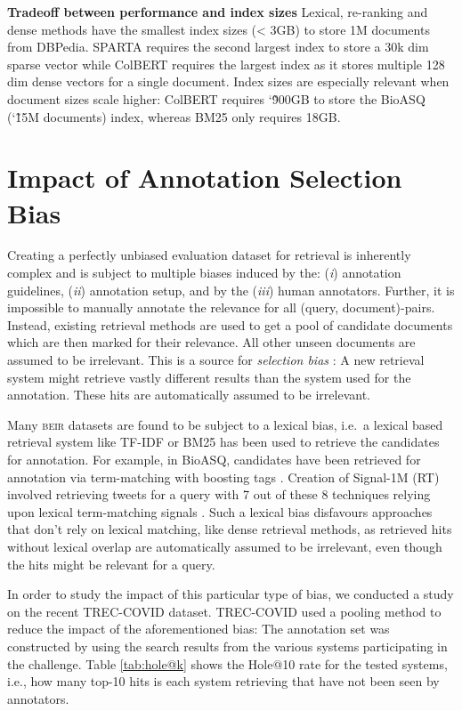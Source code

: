 \documentclass{article}
\newcommand{\custo}[1]{\textsc{\normalsize #1}}
\newcommand{\beir}{\custo{beir}\xspace}
\begin{document}
\textbf{Tradeoff between performance and index sizes} \quad Lexical, re-ranking and dense methods have the smallest index sizes (< 3GB) to store 1M documents from DBPedia. SPARTA requires the second largest index to store a 30k dim sparse vector while ColBERT requires the largest index as it stores multiple 128 dim dense vectors for a single document. Index sizes are especially relevant when document sizes scale higher: ColBERT requires \char`\~900GB to store the BioASQ (\char`\~15M documents) index, whereas BM25 only requires 18GB. 

\vspace{-3mm}
\section{Impact of Annotation Selection Bias}\label{sec:biases-analysis}
\vspace{-2mm}

Creating a perfectly unbiased evaluation dataset for retrieval is inherently complex and is subject to multiple biases induced by the: (\emph{i}) annotation guidelines, (\emph{ii}) annotation setup, and by the (\emph{iii}) human annotators. Further, it is impossible to manually annotate the relevance for all (query, document)-pairs. Instead, existing retrieval methods are used to get a pool of candidate documents which are then marked for their relevance. All other unseen documents are assumed to be irrelevant.
This is a source for \textit{selection bias} \cite{selection_bias}: A new retrieval system might retrieve vastly different results than the system used for the annotation. These hits are automatically assumed to be irrelevant.

Many \beir datasets are found to be subject to a lexical bias, i.e.\ a lexical based retrieval system like TF-IDF or BM25 has been used to retrieve the candidates for annotation. For example, in BioASQ, candidates have been retrieved for annotation via term-matching with boosting tags \cite{tsatsaronis2015overview}. Creation of Signal-1M (RT) involved retrieving tweets for a query with 7 out of these 8 techniques relying upon lexical term-matching signals \cite{Signal1MRelatedTweetsRetrieval2018}. Such a lexical bias disfavours approaches that don't rely on lexical matching, like dense retrieval methods, as retrieved hits without lexical overlap are automatically assumed to be irrelevant, even though the hits might be relevant for a query.

In order to study the impact of this particular type of bias, we conducted a study on the recent TREC-COVID dataset. TREC-COVID used a pooling method \cite{10.1145/2911451.2911473, lipani2016curious} to reduce the impact of the aforementioned bias: The annotation set was constructed by using the search results from the various systems participating in the challenge.  Table \ref{tab:hole@k} shows the Hole@10 rate \cite{xiong2020approximate} for the tested systems, i.e., how many top-10 hits is each system retrieving that have not been seen by annotators.
\end{document}
